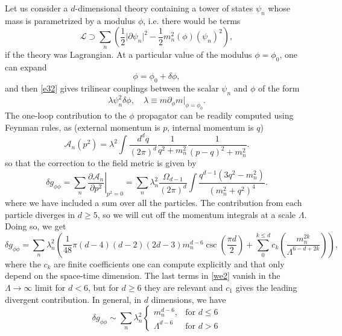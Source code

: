 \documentclass[11pt]{article}
\numberwithin{equation}{section}
\numberwithin{equation}{section}
\theoremstyle{remark}
\begin{document}
Let us consider a $d$-dimensional theory containing a tower of states $\psi_n$ whose mass is parametrized by a modulus $\phi$, i.e. there would be terms
\begin{equation}\mathcal{L}\supset \sum_n\left(\frac12 \vert \partial\psi_n\vert^2- \frac12 m^2_n(\phi) (\psi_n)^2\right)\label{e32},\end{equation}
if the theory was Lagrangian.
At a particular value of the modulus $\phi=\phi_0$, one can expand 
\begin{equation}\phi=\phi_0+\delta\phi,\end{equation}
and then \eqref{e32} gives trilinear couplings between the scalar $\psi_n$ and $\phi$ of the form
\begin{equation} \lambda \psi_n^2\delta\phi,\quad \lambda\equiv  m \partial_\phi m\vert_{\phi=\phi_0}.\end{equation} The one-loop contribution to the $\phi$ propagator
can be readily computed using Feynman rules, as (external momentum is $p$, internal momentum is $q$)
\begin{equation} \mathcal{A}_n(p^2)=\lambda^2\int \frac{d^dq}{(2\pi)^d} \frac{1}{q^2+m_n^2} \frac{1}{(p-q)^2+m_n^2}.\end{equation}
so that the correction to the field metric is given by
\begin{equation} \delta g_{\phi\phi}=\sum_n \left.\frac{\partial\mathcal{A}_n}{\partial p^2}\right\vert_{p^2=0}=\sum_n\lambda_n^2\frac{\Omega_{d-1}}{(2\pi)^d} \int \frac{ q^{d-1} \left(3 q^2-m_n^2\right)}{\left(m_n^2+q^2\right)^4}.\end{equation}
where we have included a sum over all the particles.
The contribution from each particle diverges in $d\geq 5$, so we will cut off the momentum integrals at a scale $\Lambda$. Doing so, we get
\begin{equation} \delta g_{\phi\phi}= \sum_n \lambda_n^2\left(\frac{1}{48} \pi  (d-4) (d-2) (2 d-3) m_n^{d-6} \csc \left(\frac{\pi d}{2}\right)+ \sum_0^{k\leq d} c_k\left(\frac{m_n^{2k}}{\Lambda^{6-d+2k}}\right)\right),\label{we2}\end{equation}
where the $c_k$ are finite coefficients one can compute explicitly and that only depend on the space-time dimension. 
The last terms in \eqref{we2} vanish in the $\Lambda\rightarrow\infty$ limit for $d<6$, but for $d\geq6$ they are relevant and  $c_1$ gives the leading divergent contribution. In general, in $d$ dimensions, we have
\begin{equation} \label{corr}\delta g_{\phi\phi}\sim \sum_n \lambda_n^2  \left\{\begin{array}{lr}
       m_n^{d-6}, & \text{for } d\leq 6\\
        \Lambda^{d-6}& \text{for } d>6
        \end{array}\right.
        \end{equation}
\end{document}
